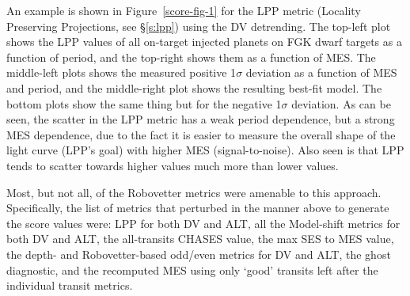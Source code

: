 An example is shown in Figure~\ref{score-fig-1} for the LPP metric (Locality Preserving Projections, see \S\ref{s:lpp}) using the DV detrending. The top-left plot shows the LPP values of all on-target injected planets on FGK dwarf targets as a function of period, and the top-right shows them as a function of MES. The middle-left plots shows the measured positive 1$\sigma$ deviation as a function of MES and period, and the middle-right plot shows the resulting best-fit model. The bottom plots show the same thing but for the negative 1$\sigma$ deviation. As can be seen, the scatter in the LPP metric has a weak period dependence, but a strong MES dependence, due to the fact it is easier to measure the overall shape of the light curve (LPP's goal) with higher MES (signal-to-noise). Also seen is that LPP tends to scatter towards higher values much more than lower values.

Most, but not all, of the Robovetter metrics were amenable to this approach. Specifically, the list of metrics that perturbed in the manner above to generate the score values were: LPP for both DV and ALT, all the Model-shift metrics for both DV and ALT, the all-transits CHASES value, the max SES to MES value, the depth- and Robovetter-based odd/even metrics for DV and ALT, the ghost diagnostic, and the recomputed MES using only `good' transits left after the individual transit metrics.

